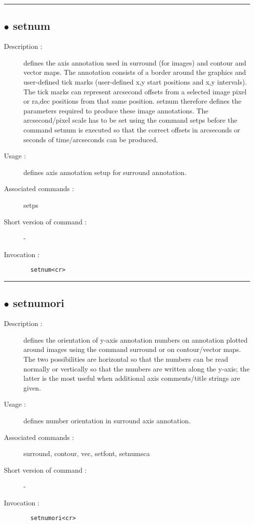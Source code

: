 \hrule \subsection*{$\bullet$ setnum}
\begin{description}
\item[Description :] defines the axis annotation used in surround (for images) and
contour and vector maps.  The annotation consists of a border around the
graphics and user-defined tick marks (user-defined x,y start positions
and x,y intervals).  The tick marks can represent arcsecond offsets from
a selected image pixel or ra,dec positions from that same position.
setnum therefore defines the parameters required to produce these image
annotations.  The arcsecond/pixel scale has to be set using the command
setps before the command setnum is executed so that the correct offsets
in arcseconds or seconds of time/arcseconds can be produced.
\item[Usage :] defines axis annotation setup for surround annotation.
\item[Associated commands :] setps
\item[Short version of command :] -
\item[Invocation :]

\verb+  setnum<cr> +\end{description}

\hrule \subsection*{$\bullet$ setnumori}
\begin{description}
\item[Description :] defines the orientation of y-axis annotation numbers on
annotation plotted around images using the command surround or on
contour/vector maps.  The two possibilities are horizontal so that the
numbers can be read normally or vertically so that the numbers are
written along the y-axis; the latter is the most useful when additional
axis comments/title strings are given.
\item[Usage :] defines number orientation in surround axis annotation.
\item[Associated commands :] surround, contour, vec, setfont, setnumsca
\item[Short version of command :] -
\item[Invocation :]

\verb+  setnumori<cr> +\end{description}

